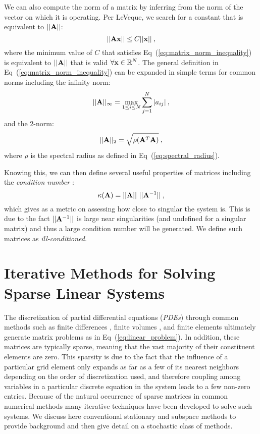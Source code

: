 We can also compute the norm of a matrix by inferring from the norm of
the vector on which it is operating. Per LeVeque, we search for a
constant that is equivalent to $||\mathbf{A}||$:
\begin{equation}
  ||\mathbf{A}\mathbf{x}|| \leq C ||\mathbf{x}||\:,
  \label{eq:matrix_norm_inequality}
\end{equation}
where the minimum value of $C$ that satisfies
Eq~(\ref{eq:matrix_norm_inequality}) is equivalent to $||\mathbf{A}||$
that is valid $\forall \mathbf{x} \in \mathbb{R}^N$. The general
definition in Eq~(\ref{eq:matrix_norm_inequality}) can be expanded in
simple terms for common norms including the infinity norm:
\begin{equation}
  ||\mathbf{A}||_{\infty} = \max_{1 \leq i \leq N} \sum^N_{j=1}|a_{ij}|\:,
  \label{eq:matrix_infinity_norm}
\end{equation}
and the 2-norm:
\begin{equation}
  ||\mathbf{A}||_{2} = \sqrt{\rho(\mathbf{A}^T\mathbf{A})}\:,
  \label{eq:matrix_2_norm}
\end{equation}
where $\rho$ is the spectral radius as defined in
Eq~(\ref{eq:spectral_radius}).

Knowing this, we can then define several useful properties of matrices
including the \textit{condition number} \citep{saad_2003}:
\begin{equation}
  \kappa(\mathbf{A}) = ||\mathbf{A}||\ ||\mathbf{A}^{-1}||\:,
  \label{eq:condition_number}
\end{equation}
which gives as a metric on assessing how close to singular the system
is. This is due to the fact $||\mathbf{A}^{-1}||$ is large near
singularities (and undefined for a singular matrix) and thus a large
condition number will be generated. We define such matrices as
\textit{ill-conditioned}. 

\section{Iterative Methods for Solving Sparse Linear Systems}
\label{sec:linear_methods}
The discretization of partial differential equations (\textit{PDEs})
through common methods such as finite differences
\citep{leveque_2007}, finite volumes \citep{leveque_2002}, and finite
elements \citep{zienkiewicz_1977} ultimately generate matrix problems
as in Eq~(\ref{eq:linear_problem}).  In addition, these matrices are
typically sparse, meaning that the vast majority of their constituent
elements are zero. This sparsity is due to the fact that the influence
of a particular grid element only expands as far as a few of its
nearest neighbors depending on the order of discretization used, and
therefore coupling among variables in a particular discrete equation
in the system leads to a few non-zero entries. Because of the natural
occurrence of sparse matrices in common numerical methods many
iterative techniques have been developed to solve such systems. We
discuss here conventional stationary and subspace methods to provide
background and then give detail on a stochastic class of methods.


